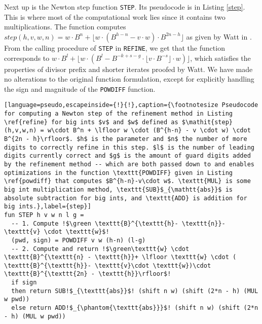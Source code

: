 Next up is the Newton step function \texttt{STEP}. Its pseudocode is in Listing
\ref{step}. This is where most of the computational work lies since it contains
two multiplications. The function computes
$\mathit{step}(h,v,w,n) = w\cdot B^n + \lfloor w \cdot (B^{h-n} - v \cdot w) \cdot B^{2n - h}\rfloor$ as
given by Watt in \cite{watt2023efficient}. From the calling procedure of
\texttt{STEP} in \texttt{REFINE}, we get that the function corresponds to
$w\cdot B^l + \lfloor w \cdot (B^{l} - B^{-k+s-g} \cdot \lfloor v\cdot B^{-s} \rfloor \cdot w)\rfloor$, which satisfies the
properties of divisor prefix and shorter iterates proofed by Watt. We have made
no alterations to the original function formulation, except for explicitly
handling the sign and magnitude of the \texttt{POWDIFF} function.

\begin{lstlisting}[language=pseudo,escapeinside={!}{!},caption={\footnotesize Pseudocode for computing a Newton step of the refinement method in Listing \ref{refine} for big ints $v$ and $w$ defined as $\mathit{step}(h,v,w,n) = w\cdot B^n + \lfloor w \cdot (B^{h-n} - v \cdot w) \cdot B^{2n - h}\rfloor$. $h$ is the parameter and $n$ the number of more digits to correctly refine in this step. $l$ is the number of leading digits currently correct and $g$ is the amount of guard digits added by the refinement method -- which are both passed down to and enables optimizations in the function \texttt{POWDIFF} given in Listing \ref{powdiff} that computes $B^{h-n}-v\cdot w$. \texttt{MUL} is some big int multiplication method, \texttt{SUB}$_{\mathtt{abs}}$ is absolute subtraction for big ints, and \texttt{ADD} is addition for big ints.},label={step}]
fun STEP h v w n l g =
  -- 1. Compute !$\green \texttt{B}^{\texttt{h}- \texttt{n}}- \texttt{v} \cdot \texttt{w}$!
  (pwd, sign) = POWDIFF v w (h-n) (l-g)
  -- 2. Compute and return !$\green\texttt{w} \cdot \texttt{B}^{\texttt{n} - \texttt{h}}+ \lfloor \texttt{w} \cdot ( \texttt{B}^{\texttt{h}}- \texttt{v}\cdot \texttt{w})\cdot \texttt{B}^{\texttt{2n} - \texttt{h}}\rfloor$!
  if sign
  then return SUB!$_{\texttt{abs}}$! (shift n w) (shift (2*n - h) (MUL w pwd))
  else return ADD!$_{\phantom{\texttt{abs}}}$! (shift n w) (shift (2*n - h) (MUL w pwd))
\end{lstlisting}

